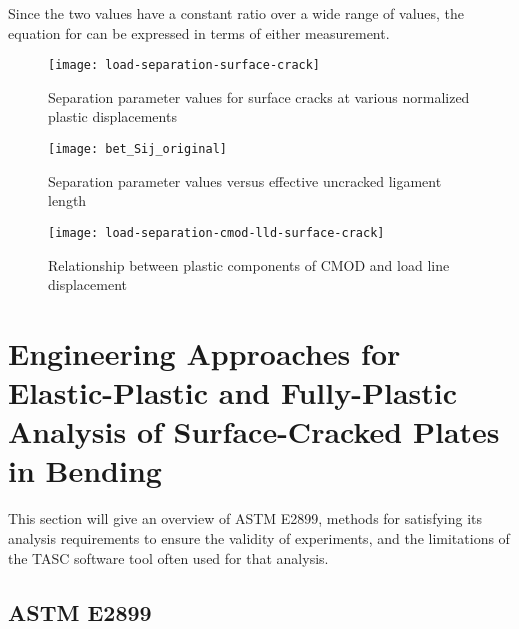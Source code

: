 Since the two values have a constant ratio over a wide range of \Deltapl values, the equation for \Jpl can be expressed in terms of either measurement.
\begin{figure}
\centering
\texttt{[image: load-separation-surface-crack]}
\caption[Separation parameter values for surface cracks at various normalized plastic displacements]{\label{fig:load-separation-surface-crack} Separation parameter values for surface cracks at various normalized plastic displacements \cite{sharobeamlandes1994}}
\end{figure}
\begin{figure}
\centering
\texttt{[image: bet\_Sij\_original]}
\caption[Separation parameter values versus effective uncracked ligament length]{\label{fig:bet_Sij_original} Separation parameter values versus effective uncracked ligament length \cite{sharobeamlandes1994}}
\end{figure}
\begin{figure}
\centering
\texttt{[image: load-separation-cmod-lld-surface-crack]}
\caption[Relationship between plastic components of CMOD and load line displacement]{\label{fig:load-separation-cmod-lld-surface-crack} Relationship between plastic components of CMOD and load line displacement \cite{sharobeamlandes1994}}
\end{figure}

\FloatBarrier

\section{Engineering Approaches for Elastic-Plastic and Fully-Plastic Analysis of Surface-Cracked Plates in Bending}

This section will give an overview of ASTM E2899, methods for satisfying its analysis requirements to ensure the validity of experiments, and the limitations of the TASC software tool often used for that analysis.

\subsection{ASTM E2899}

